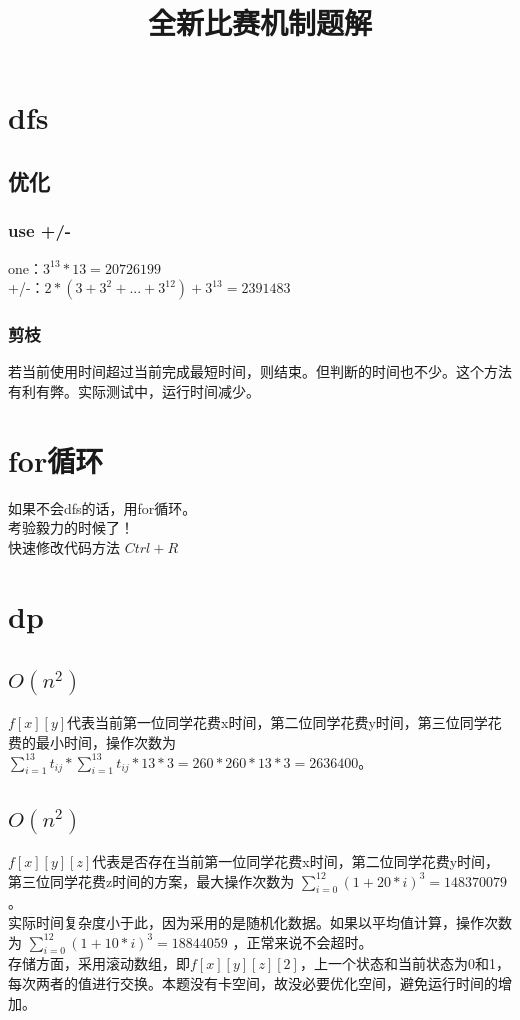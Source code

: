\documentclass{article}
\date{}
\title{全新比赛机制题解}
\begin{document}
		\maketitle \vspace{-50pt}
		
		\section{dfs}
		
			\subsection{优化}
			
				\subsubsection{use +/-}
				\indent one：$3^{13}*13 = 20726199$\\
				\indent +/-：$2*(3+3^{2}+...+3^{12})+3^{13} = 2391483$
				
				\subsubsection{剪枝}
				\indent 若当前使用时间超过当前完成最短时间，则结束。但判断的时间也不少。这个方法有利有弊。实际测试中，运行时间减少。
				
		\section{for循环}
		\indent 如果不会dfs的话，用for循环。\\
		\indent 考验毅力的时候了！ \\
		\indent 快速修改代码方法 $Ctrl+R$

		\section{dp}
		\subsection{$O(n^{2})$}
		\indent $f[x][y]$代表当前第一位同学花费x时间，第二位同学花费y时间，第三位同学花费的最小时间，操作次数为
		$
		\sum_{i=1}^{13} t_{ij}*
		\sum_{i=1}^{13} t_{ij}
		*13*3=260*260*13*3=2636400
		$。
		
		\subsection{$O(n^{2})$}
		\indent $f[x][y][z]$代表是否存在当前第一位同学花费x时间，第二位同学花费y时间，第三位同学花费z时间的方案，最大操作次数为
		$
		\sum_{i=0}^{12}(1+20*i)^{3}=148370079
		$。\\
		\indent 实际时间复杂度小于此，因为采用的是随机化数据。如果以平均值计算，操作次数为
		$
		\sum_{i=0}^{12}(1+10*i)^{3}=18844059
		$
		 ，正常来说不会超时。\\
		\indent 存储方面，采用滚动数组，即$f[x][y][z][2]$，上一个状态和当前状态为0和1，每次两者的值进行交换。本题没有卡空间，故没必要优化空间，避免运行时间的增加。
		
	
\end{document}
